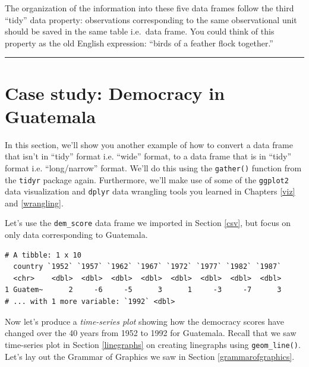 \documentclass[12pt, krantz2,]{krantz}
\makeatletter
\newenvironment{Shaded}{\begin{snugshade}}{\end{snugshade}}
\newcommand{\KeywordTok}[1]{\textcolor[rgb]{0.27,0.27,0.27}{\textbf{#1}}}
\newcommand{\NormalTok}[1]{#1}
\newcommand{\OperatorTok}[1]{\textcolor[rgb]{0.43,0.43,0.43}{\textbf{#1}}}
\newcommand{\StringTok}[1]{\textcolor[rgb]{0.5,0.5,0.5}{#1}}
\newenvironment{kframe}{%
\medskip{}
\setlength{\fboxsep}{.8em}
 \def\at@end@of@kframe{}%
 \ifinner\ifhmode%
  \def\at@end@of@kframe{\end{minipage}}%
  \begin{minipage}{\columnwidth}%
 \fi\fi%
 \def\FrameCommand##1{\hskip\@totalleftmargin \hskip-\fboxsep
 \colorbox{shadecolor}{##1}\hskip-\fboxsep
     \hskip-\linewidth \hskip-\@totalleftmargin \hskip\columnwidth}%
 \MakeFramed {\advance\hsize-\width
   \@totalleftmargin\z@ \linewidth\hsize
   \@setminipage}}%
 {\par\unskip\endMakeFramed%
 \at@end@of@kframe}
\renewenvironment{Shaded}{\begin{kframe}}{\end{kframe}}
\makeatother
\begin{document}
The organization of the information into these five data frames follow the third ``tidy'' data property: observations corresponding to the same observational unit should be saved in the same table i.e.~data frame. You could think of this property as the old English expression: ``birds of a feather flock together.''

\begin{center}\rule{0.5\linewidth}{\linethickness}\end{center}

\hypertarget{case-study-tidy}{%
\section{Case study: Democracy in Guatemala}\label{case-study-tidy}}

In this section, we'll show you another example of how to convert a data frame that isn't in ``tidy'' format i.e. ``wide'' format, to a data frame that is in ``tidy'' format i.e. ``long/narrow'' format. We'll do this using the \texttt{gather()} function from the \texttt{tidyr} package again. Furthermore, we'll make use of some of the \texttt{ggplot2} data visualization and \texttt{dplyr} data wrangling tools you learned in Chapters \ref{viz} and \ref{wrangling}.

Let's use the \texttt{dem\_score} data frame we imported in Section \ref{csv}, but focus on only data corresponding to Guatemala.

\begin{Shaded}
\end{Shaded}

\begin{verbatim}
# A tibble: 1 x 10
  country `1952` `1957` `1962` `1967` `1972` `1977` `1982` `1987`
  <chr>    <dbl>  <dbl>  <dbl>  <dbl>  <dbl>  <dbl>  <dbl>  <dbl>
1 Guatem~      2     -6     -5      3      1     -3     -7      3
# ... with 1 more variable: `1992` <dbl>
\end{verbatim}

Now let's produce a \emph{time-series plot} showing how the democracy scores have changed over the 40 years from 1952 to 1992 for Guatemala. Recall that we saw time-series plot in Section \ref{linegraphs} on creating linegraphs using \texttt{geom\_line()}. Let's lay out the Grammar of Graphics we saw in Section \ref{grammarofgraphics}.
\end{document}
